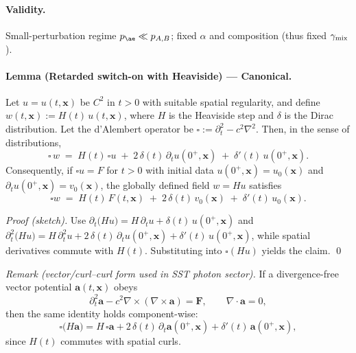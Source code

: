 \documentclass[10pt,reprint,aps,onecolumn,nofootinbib]{revtex4-2}
\begin{document}
    \paragraph{Validity.} Small-perturbation regime $p_{\ae}\ll p_{A,B}$; fixed $\alpha$ and composition (thus fixed $\gamma_{\rm mix}$).




    \paragraph{Lemma (Retarded switch-on with Heaviside) — Canonical.}
        Let $u=u(t,\mathbf{x})$ be $C^2$ in $t>0$ with suitable spatial regularity, and define $w(t,\mathbf{x}) := H(t)\,u(t,\mathbf{x})$, where $H$ is the Heaviside step and $\delta$ is the Dirac distribution.
        Let the d’Alembert operator be $\square := \partial_t^2 - c^2 \nabla^2$. Then, in the sense of distributions,
        \[
            \square\,w \;=\; H(t)\,\square u \;+\; 2\,\delta(t)\,\partial_t u(0^+,\mathbf{x}) \;+\; \delta'(t)\,u(0^+,\mathbf{x}).
        \]
        Consequently, if $\square u = F$ for $t>0$ with initial data $u(0^+,\mathbf{x})=u_0(\mathbf{x})$ and $\partial_t u(0^+,\mathbf{x})=v_0(\mathbf{x})$, the globally defined field $w=H u$ satisfies
        \[
            \square w \;=\; H(t)\,F(t,\mathbf{x}) \;+\; 2\,\delta(t)\,v_0(\mathbf{x}) \;+\; \delta'(t)\,u_0(\mathbf{x}).
        \]

        \emph{Proof (sketch).}
        Use $\partial_t\!\big(Hu\big)=H\,\partial_t u+\delta(t)\,u(0^+,\mathbf{x})$ and
        $\partial_t^2\!\big(Hu\big)=H\,\partial_t^2u+2\,\delta(t)\,\partial_t u(0^+,\mathbf{x})+\delta'(t)\,u(0^+,\mathbf{x})$,
        while spatial derivatives commute with $H(t)$. Substituting into $\square(Hu)$ yields the claim. \qed

        \emph{Remark (vector/curl–curl form used in SST photon sector).}
        If a divergence-free vector potential $\mathbf{a}(t,\mathbf{x})$ obeys
        \[
            \partial_t^2 \mathbf{a} - c^2 \nabla\times(\nabla\times \mathbf{a}) = \mathbf{F},\qquad \nabla\!\cdot\!\mathbf{a}=0,
        \]
        then the same identity holds component-wise:
        \[
            \square\!\big(H\mathbf{a}\big) = H\,\square\mathbf{a} + 2\,\delta(t)\,\partial_t \mathbf{a}(0^+,\mathbf{x}) + \delta'(t)\,\mathbf{a}(0^+,\mathbf{x}),
        \]
        since $H(t)$ commutes with spatial curls.
\end{document}
